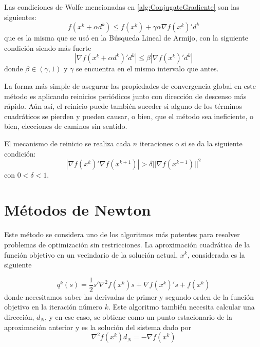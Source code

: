 Las condiciones de Wolfe mencionadas en \ref{alg:ConjugateGradiente} son las siguientes:
\begin{equation}
f(x^k + \alpha d^k) \leq f(x^k) + \gamma\alpha\nabla f(x^k)'d^k
\label{eq:4.20}
\end{equation}
que es la misma que se usó en la Búsqueda Lineal de Armijo, con la siguiente condición siendo más fuerte
\begin{equation}
|\nabla f(x^k+\alpha d^k)'d^k| \leq \beta |\nabla f(x^k)'d^k|
\label{eq:4.21}
\end{equation}
donde $\beta\in (\gamma,1)$ y $\gamma$ se encuentra en el mismo intervalo que antes.

La forma más simple de asegurar las propiedades de convergencia global en este método es aplicando reinicios periódicos junto con dirección de descenso más rápido. 
Aún así, el reinicio puede también suceder si alguno de los términos cuadráticos se pierden y pueden causar, o bien, que el método sea ineficiente, o bien, elecciones de caminos sin sentido.

El mecanismo de reinicio se realiza cada $n$ iteraciones o si se da la siguiente condición:
\begin{equation*}
|\nabla f(x^k)'\nabla f(x^{k+1})| > \delta ||\nabla f(x^{k-1})||^2
\end{equation*}
con $0 < \delta < 1$.


\section{Métodos de Newton}

Este método se considera uno de los algoritmos más potentes para resolver problemas de optimización sin restricciones. 
La aproximación cuadrática de la función objetivo en un vecindario de la solución actual, $x^k$, considerada es la siguiente

\begin{equation*}
q^k(s) = \dfrac{1}{2}s'\nabla^2f(x^k)s+\nabla f(x^k)'s+f(x^k) 
\end{equation*}
donde necesitamos saber las derivadas de primer y segundo orden de la función objetivo en la iteración número $k$. 
Este algoritmo también necesita calcular una dirección, $d_N$, y en ese caso, se obtiene como un punto estacionario de la aproximación anterior y es la solución del sistema dado por
\begin{equation}
\nabla^2 f(x^k)d_N = -\nabla f(x^k)
\label{eq:4.22}
\end{equation}

